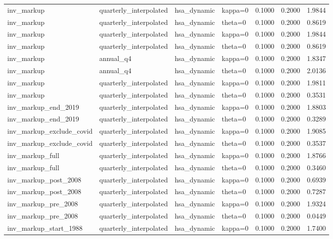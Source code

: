 \begin{tabular}{llllrrr}
inv\_markup & quarterly\_interpolated & hsa\_dynamic & kappa=0 & 0.1000 & 0.2000 & 1.9844 \\
inv\_markup & quarterly\_interpolated & hsa\_dynamic & theta=0 & 0.1000 & 0.2000 & 0.8619 \\
inv\_markup & quarterly\_interpolated & hsa\_dynamic & kappa=0 & 0.1000 & 0.2000 & 1.9844 \\
inv\_markup & quarterly\_interpolated & hsa\_dynamic & theta=0 & 0.1000 & 0.2000 & 0.8619 \\
inv\_markup & annual\_q4 & hsa\_dynamic & kappa=0 & 0.1000 & 0.2000 & 1.8347 \\
inv\_markup & annual\_q4 & hsa\_dynamic & theta=0 & 0.1000 & 0.2000 & 2.0136 \\
inv\_markup & quarterly\_interpolated & hsa\_dynamic & kappa=0 & 0.1000 & 0.2000 & 1.9811 \\
inv\_markup & quarterly\_interpolated & hsa\_dynamic & theta=0 & 0.1000 & 0.2000 & 0.3531 \\
inv\_markup\_end\_2019 & quarterly\_interpolated & hsa\_dynamic & kappa=0 & 0.1000 & 0.2000 & 1.8803 \\
inv\_markup\_end\_2019 & quarterly\_interpolated & hsa\_dynamic & theta=0 & 0.1000 & 0.2000 & 0.3289 \\
inv\_markup\_exclude\_covid & quarterly\_interpolated & hsa\_dynamic & kappa=0 & 0.1000 & 0.2000 & 1.9085 \\
inv\_markup\_exclude\_covid & quarterly\_interpolated & hsa\_dynamic & theta=0 & 0.1000 & 0.2000 & 0.3537 \\
inv\_markup\_full & quarterly\_interpolated & hsa\_dynamic & kappa=0 & 0.1000 & 0.2000 & 1.8766 \\
inv\_markup\_full & quarterly\_interpolated & hsa\_dynamic & theta=0 & 0.1000 & 0.2000 & 0.3460 \\
inv\_markup\_post\_2008 & quarterly\_interpolated & hsa\_dynamic & kappa=0 & 0.1000 & 0.2000 & 0.6939 \\
inv\_markup\_post\_2008 & quarterly\_interpolated & hsa\_dynamic & theta=0 & 0.1000 & 0.2000 & 0.7287 \\
inv\_markup\_pre\_2008 & quarterly\_interpolated & hsa\_dynamic & kappa=0 & 0.1000 & 0.2000 & 1.9324 \\
inv\_markup\_pre\_2008 & quarterly\_interpolated & hsa\_dynamic & theta=0 & 0.1000 & 0.2000 & 0.0449 \\
inv\_markup\_start\_1988 & quarterly\_interpolated & hsa\_dynamic & kappa=0 & 0.1000 & 0.2000 & 1.7400 \\

\end{tabular}
